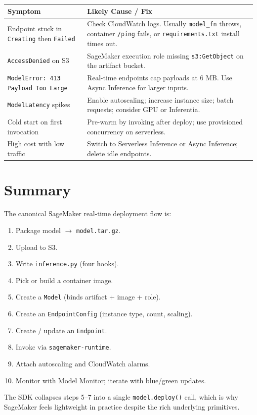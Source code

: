 \documentclass[11pt,a4paper]{article}
\begin{document}
\begin{longtable}{p{5.5cm} p{9.2cm}}
\toprule
\textbf{Symptom} & \textbf{Likely Cause / Fix} \\
\midrule
Endpoint stuck in \texttt{Creating} then \texttt{Failed} &
Check CloudWatch logs. Usually \texttt{model\_fn} throws, container \texttt{/ping}
fails, or \texttt{requirements.txt} install times out. \\
\addlinespace
\texttt{AccessDenied} on S3 &
SageMaker execution role missing \texttt{s3:GetObject} on the artifact bucket. \\
\addlinespace
\texttt{ModelError: 413 Payload Too Large} &
Real-time endpoints cap payloads at 6 MB. Use Async Inference for larger inputs. \\
\addlinespace
\texttt{ModelLatency} spikes &
Enable autoscaling; increase instance size; batch requests; consider GPU or
Inferentia. \\
\addlinespace
Cold start on first invocation &
Pre-warm by invoking after deploy; use provisioned concurrency on serverless. \\
\addlinespace
High cost with low traffic &
Switch to Serverless Inference or Async Inference; delete idle endpoints. \\
\bottomrule
\end{longtable}

\section{Summary}

The canonical SageMaker real-time deployment flow is:

\begin{enumerate}[leftmargin=*,nosep]
    \item Package model $\rightarrow$ \texttt{model.tar.gz}.
    \item Upload to S3.
    \item Write \texttt{inference.py} (four hooks).
    \item Pick or build a container image.
    \item Create a \texttt{Model} (binds artifact + image + role).
    \item Create an \texttt{EndpointConfig} (instance type, count, scaling).
    \item Create / update an \texttt{Endpoint}.
    \item Invoke via \texttt{sagemaker-runtime}.
    \item Attach autoscaling and CloudWatch alarms.
    \item Monitor with Model Monitor; iterate with blue/green updates.
\end{enumerate}

The SDK collapses steps 5--7 into a single \texttt{model.deploy()} call, which
is why SageMaker feels lightweight in practice despite the rich underlying
primitives.
\end{document}
